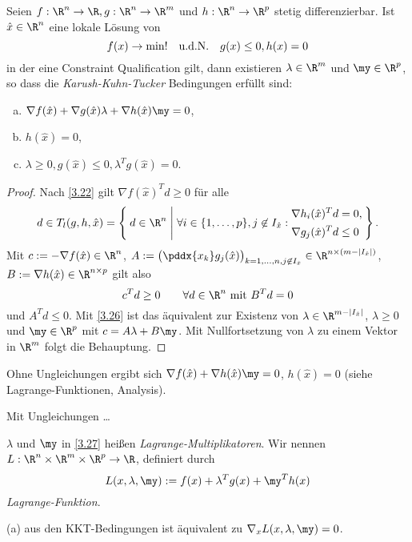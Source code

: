 \begin{st} \label{3.27}
	Seien $f: \R^n \to \R, g: \R^n \to \R^m$ und $h: \R^n \to \R^p$ stetig differenzierbar.
	Ist $\hat x \in \R^n$ eine lokale Lösung von
	\[
		f(x) \to \min! \quad\text{u.d.N.}\quad g(x) \le 0, h(x) = 0
	\]
	in der eine Constraint Qualification gilt, dann existieren $\lambda \in \R^m$ und $\my \in \R^p$, so dass die \emph{Karush-Kuhn-Tucker} Bedingungen erfüllt sind:
	\begin{enumerate}[(a)]
		\item
			$\nabla f(\hat x) + \nabla g(\hat x) \lambda + \nabla h(\hat x) \my = 0$,
		\item
			$h(\hat x) = 0$,
		\item
			$\lambda \ge 0, g(\hat x) \le 0, \lambda^T g(\hat x) = 0$.
	\end{enumerate}
	\begin{proof}
		Nach \ref{3.22} gilt $\nabla f(\hat x)^T d \ge 0$ für alle
		\[
			d \in T_l(g,h,\hat x)
			= \Set{ d \in \R^n | \forall i \in \{1, \dotsc, p\}, j \not\in I_{\hat x} :
				\begin{aligned}
					\nabla h_i(\hat x)^T d &= 0, \\
					\nabla g_j(\hat x)^T d &\le 0
				\end{aligned} }.
		\]
		Mit $c := - \nabla f(\hat x) \in \R^n$, $A := \big( \pddx{x_k} g_j(\hat x) \big)_{k=1,\dotsc,n, j\not\in I_{\hat x}} \in \R^{n \times (m-|I_{\hat x}|)}$, $B := \nabla h(\hat x) \in \R^{n\times p}$ gilt also
		\[
			c^T d \ge 0 \qquad \forall d \in \R^n \text{ mit } B^T d = 0
		\]
		und $A^T d \le 0$.
		Mit \ref{3.26} ist das äquivalent zur Existenz von $\lambda \in \R^{m-|I_{\hat x}|}$, $\lambda \ge 0$ und $\my \in \R^p$ mit $c = A \lambda + B \my$.
		Mit Nullfortsetzung von $\lambda$ zu einem Vektor in $\R^m$ folgt die Behauptung.
	\end{proof}
\end{st}

Ohne Ungleichungen ergibt sich $\nabla f(\hat x) + \nabla h(\hat x) \my = 0$, $h(\hat x) = 0$ (siehe Lagrange-Funktionen, Analysis).

Mit Ungleichungen …



\begin{df} \label{3.28}
	$\lambda$ und $\my$ in \ref{3.27} heißen \emph{Lagrange-Multiplikatoren}.
	Wir nennen $L: \R^n \times \R^m \times \R^p \to \R$, definiert durch
	\[
		L(x, \lambda, \my) := f(x) + \lambda^T g(x) + \my^T h(x)
	\]
	\emph{Lagrange-Funktion}.
	\begin{note}
		(a) aus den KKT-Bedingungen ist äquivalent zu $\nabla_x L(x, \lambda, \my) = 0$.
	\end{note}
\end{df}


